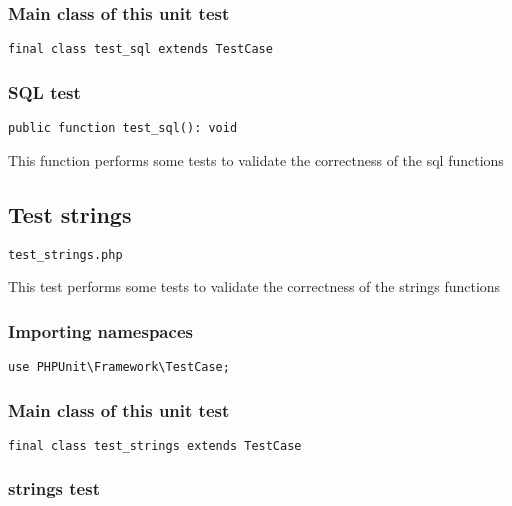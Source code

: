 \documentclass[a4paper]{article}
\begin{document}
\subsubsection{Main class of this unit test}

\begin{lstlisting}
final class test_sql extends TestCase
\end{lstlisting}

\hypertarget{toc337}{}
\subsubsection{SQL test}

\begin{lstlisting}
public function test_sql(): void
\end{lstlisting}

This function performs some tests to validate the correctness
of the sql functions

\hypertarget{toc338}{}
\subsection{Test strings}

\begin{lstlisting}
test_strings.php
\end{lstlisting}

This test performs some tests to validate the correctness
of the strings functions

\hypertarget{toc339}{}
\subsubsection{Importing namespaces}

\begin{lstlisting}
use PHPUnit\Framework\TestCase;
\end{lstlisting}

\hypertarget{toc340}{}
\subsubsection{Main class of this unit test}

\begin{lstlisting}
final class test_strings extends TestCase
\end{lstlisting}

\hypertarget{toc341}{}
\subsubsection{strings test}
\end{document}
